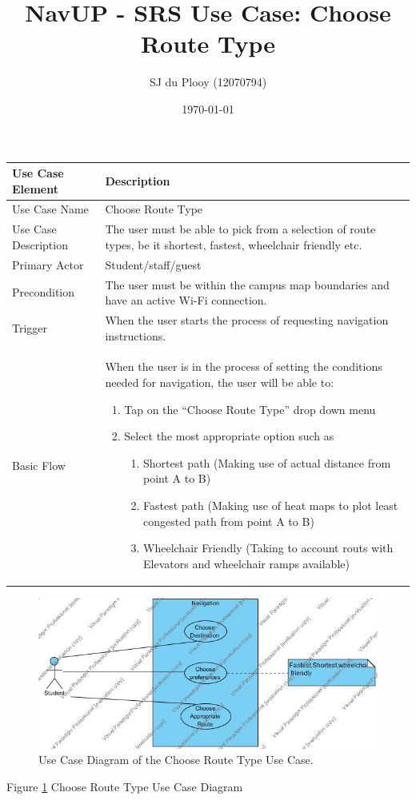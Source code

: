 \documentclass[12pt]{article}
\begin{document}
\title{NavUP - SRS Use Case: Choose Route Type}
\author{SJ du Plooy (12070794)}
\date{\today}
\maketitle


\begin{tabular}{|p{4cm}|p{10cm}|}
\hline

Use Case Element & Description \\
\hline

Use Case Name & 
Choose Route Type \\
\hline

Use Case Description & 
The user must be able to pick from a selection of route types, be it shortest, fastest, wheelchair friendly etc.   \\
\hline

Primary Actor & 
Student/staff/guest \\
\hline

Precondition & 
The user must be within the campus map boundaries and have an active Wi-Fi connection.   \\
\hline

Trigger & 
When the user starts the process of requesting navigation instructions.   \\
\hline

Basic Flow & 
When the user is in the process of setting the conditions needed for navigation, the user will be able to:
\begin{enumerate}
\item Tap on the “Choose Route Type” drop down menu
\item Select the most appropriate option such as
	\begin{enumerate}
	\item Shortest path (Making use of actual distance from point A to B)
	\item Fastest path (Making use of heat maps to plot least congested path from point A to B)
	\item Wheelchair Friendly (Taking to account routs with Elevators and wheelchair ramps available)
	\end{enumerate}
\end{enumerate} \\
\hline

\hline
\end{tabular}


\begin{figure}

\includegraphics[width=\linewidth]{UseCaseDiagram_ChooseRouteType.jpg}
\caption{Use Case Diagram of the Choose Route Type Use Case.}
\label{fig:UCD1}

\end{figure}

Figure \ref{fig:UCD1} Choose Route Type Use Case Diagram
\end{document}
